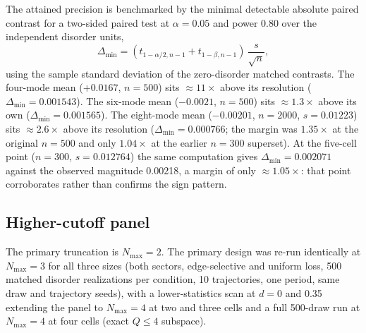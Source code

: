 \documentclass[aps,pra,preprint,superscriptaddress,amsmath,amssymb]{revtex4-2}
\begin{document}
The attained precision is benchmarked by the minimal detectable absolute paired contrast for a two-sided paired test at $\alpha=\num{0.05}$ and power \num{0.80} over the independent disorder units,
\begin{equation}\label{eq:power}
\Delta_{\min}=(t_{1-\alpha/2,n-1}+t_{1-\beta,n-1})\,\frac{s}{\sqrt{n}},
\end{equation}
using the sample standard deviation of the zero-disorder matched contrasts. The four-mode mean ($+\num{0.0167}$, $n=\num{500}$) sits $\approx\num{11}\times$ above its resolution ($\Delta_{\min}=\num{0.001543}$). The six-mode mean ($-\num{0.0021}$, $n=\num{500}$) sits $\approx\num{1.3}\times$ above its own ($\Delta_{\min}=\num{0.001565}$). The eight-mode mean ($-\num{0.00201}$, $n=\num{2000}$, $s=\num{0.01223}$) sits $\approx\num{2.6}\times$ above its resolution ($\Delta_{\min}=\num{0.000766}$; the margin was $\num{1.35}\times$ at the original $n=\num{500}$ and only $\num{1.04}\times$ at the earlier $n=\num{300}$ superset). At the five-cell point ($n=\num{300}$, $s=\num{0.012764}$) the same computation gives $\Delta_{\min}=\num{0.002071}$ against the observed magnitude \num{0.00218}, a margin of only $\approx\num{1.05}\times$: that point corroborates rather than confirms the sign pattern.

\subsection{Higher-cutoff panel}
\label{sec:nmaxpanel}

The primary truncation is $N_{\max}=\num{2}$. The primary design was re-run identically at $N_{\max}=\num{3}$ for all three sizes (both sectors, edge-selective and uniform loss, \num{500} matched disorder realizations per condition, \num{10} trajectories, one period, same draw and trajectory seeds), with a lower-statistics scan at $d=\num{0}$ and \num{0.35} extending the panel to $N_{\max}=\num{4}$ at two and three cells and a full \num{500}-draw run at $N_{\max}=\num{4}$ at four cells (exact $Q\le\num{4}$ subspace).
\end{document}
